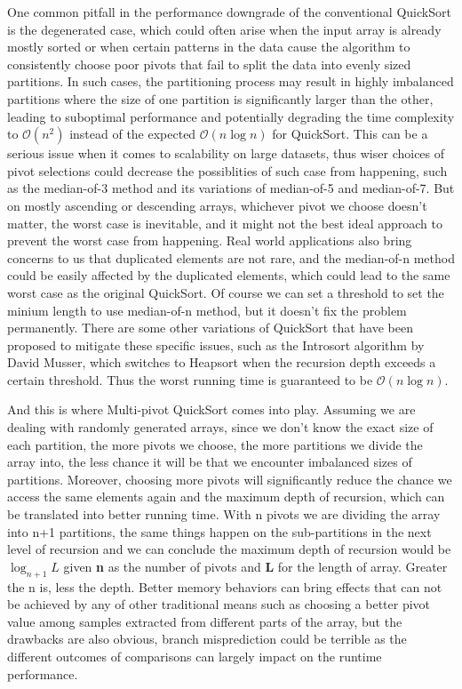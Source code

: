 \documentclass[a4paper,oneside,12pt]{book}
\newcommand{\bigO}{\mathcal{O}}
\begin{document}
One common pitfall in the performance downgrade of the conventional QuickSort is the degenerated case,
which could often arise when the input array is already mostly sorted or when certain patterns in the data cause the algorithm to consistently choose poor pivots
that fail to split the data into evenly sized partitions. 
In such cases, the partitioning process may result in highly imbalanced partitions where the size of one partition is significantly larger than the other, leading to suboptimal performance and
potentially degrading the time complexity to $\bigO(n^2)$ instead of the expected $\bigO(n\log n)$ for QuickSort. This can be a serious issue when it comes to scalability on large datasets, thus
wiser choices of pivot selections could decrease the possiblities of such case from happening, such as the median-of-3 method and its variations of median-of-5 and median-of-7.
But on mostly ascending or descending arrays, whichever pivot we choose doesn't matter, the worst case is inevitable,
and it might not the best ideal approach to prevent the worst case from happening. Real world applications also bring concerns to us that duplicated elements are not rare,
and the median-of-n method could be easily affected by the duplicated elements, which could lead to the same worst case as the original QuickSort.
Of course we can set a threshold to set the minium length to use median-of-n method, but it doesn't fix the problem permanently.
There are some other variations of QuickSort that have been proposed to mitigate these specific issues, such as the Introsort algorithm \cite{Introsort} by David Musser,
which switches to Heapsort when the recursion depth exceeds a certain threshold. Thus the worst running time is guaranteed to be $\bigO(n\log n)$.

And this is where Multi-pivot QuickSort comes into play. Assuming we are dealing with randomly generated arrays,
since we don't know the exact size of each partition, the more pivots we choose, the more partitions we divide the array into,
the less chance it will be that we encounter imbalanced sizes of partitions. 
Moreover, choosing more pivots will significantly reduce the chance we access the same elements again and the maximum depth of recursion,
which can be translated into better running time. With n pivots we are dividing the array into n+1 partitions, the same things happen on the sub-partitions 
in the next level of recursion and we can conclude the maximum depth of recursion would be $\log_{n+1} L$ given \textbf{n} as the number of pivots and \textbf{L} for the length of array.
Greater the n is, less the depth. Better memory behaviors can bring effects that can not be achieved by any of other traditional means such as choosing a better pivot value
among samples extracted from different parts of the array, but the drawbacks are also obvious, 
branch misprediction could be terrible as the different outcomes of comparisons can largely impact on the runtime performance.
\end{document}
